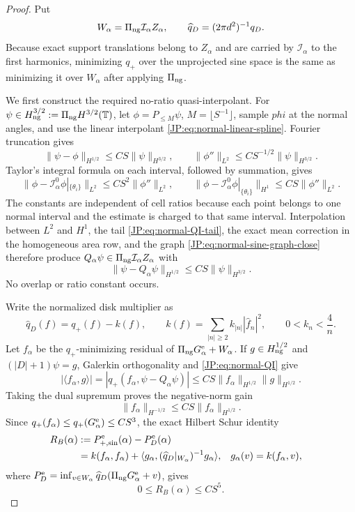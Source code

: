 \documentclass[11pt]{amsart}
\numberwithin{equation}{section}
\theoremstyle{definition}
\theoremstyle{remark}
\begin{document}
\begin{proof}
Put
\[
 W_\alpha=\Pi_{\rm ng}\mathcal I_\alpha Z_\alpha,
 \qquad
 \widehat q_D=(2\pi d^2)^{-1}q_D.
\]
Because exact support translations belong to $Z_\alpha$ and are carried by
$\mathcal I_\alpha$ to the first harmonics, minimizing $q_+$ over the
unprojected sine space is the same as minimizing it over $W_\alpha$ after
applying $\Pi_{\rm ng}$.

We first construct the required no-ratio quasi-interpolant.  For
$\psi\in H_{\rm ng}^{3/2}:=\Pi_{\rm ng}H^{3/2}(\mathbb T)$, let
$\phi=P_{\le M}\psi$, $M=\lfloor S^{-1}\rfloor$, sample $phi$ at the
normal angles, and use the linear interpolant
\eqref{JP:eq:normal-linear-spline}.  Fourier truncation gives
\begin{equation}\label{JP:eq:normal-QI-tail}
 \|\psi-\phi\|_{H^{1/2}}\le CS\|\psi\|_{H^{3/2}},
 \qquad
 \|\phi''\|_{L^2}\le CS^{-1/2}\|\psi\|_{H^{3/2}}.
\end{equation}
Taylor's integral formula on each interval, followed by summation, gives
\[
 \|\phi-\mathcal I_\alpha^0\phi|_{\{\theta_i\}}\|_{L^2}
 \le CS^2\|\phi''\|_{L^2},\qquad
 \|\phi-\mathcal I_\alpha^0\phi|_{\{\theta_i\}}\|_{H^1}
 \le CS\|\phi''\|_{L^2}.
\]
The constants are independent of cell ratios because each point belongs to
one normal interval and the estimate is charged to that same interval.
Interpolation between $L^2$ and $H^1$, the tail
\eqref{JP:eq:normal-QI-tail}, the exact mean correction in the homogeneous
area row, and the graph \eqref{JP:eq:normal-sine-graph-close} therefore
produce
$Q_\alpha\psi\in\Pi_{\rm ng}\mathcal I_\alpha Z_\alpha$ with
\begin{equation}\label{JP:eq:normal-QI}
 \|\psi-Q_\alpha\psi\|_{H^{1/2}}
 \le CS\|\psi\|_{H^{3/2}}.
\end{equation}
No overlap or ratio constant occurs.

Write the normalized disk multiplier as
\[
 \widehat q_D(f)
 =q_+(f)-k(f),\qquad
 k(f)=\sum_{|n|\ge2}k_{|n|}|\widehat f_n|^2,
 \qquad 0<k_n<\frac4n.
\]
Let $f_\alpha$ be the $q_+$-minimizing residual of
$\Pi_{\rm ng}G_\alpha^{\rm e}+W_\alpha$.  If
$g\in H_{\rm ng}^{1/2}$ and $(|D|+1)\psi=g$, Galerkin orthogonality and
\eqref{JP:eq:normal-QI} give
\[
 |\langle f_\alpha,g\rangle|
 =|q_+(f_\alpha,\psi-Q_\alpha\psi)|
 \le CS\|f_\alpha\|_{H^{1/2}}\|g\|_{H^{1/2}}.
\]
Taking the dual supremum proves the negative-norm gain
\[
 \|f_\alpha\|_{H^{-1/2}}
 \le CS\|f_\alpha\|_{H^{1/2}}.
\]
Since $q_+(f_\alpha)\le q_+(G_\alpha^{\rm e})\le CS^3$, the exact
Hilbert Schur identity
\begin{align*}
 R_B(\alpha)&:=P_{+,\sin}^{\rm e}(\alpha)-P_D^{\rm e}(\alpha)\\
 &=k(f_\alpha,f_\alpha)
  +\langle g_\alpha,
     (\widehat q_D|_{W_\alpha})^{-1}g_\alpha\rangle,
 &g_\alpha(v)&=k(f_\alpha,v),
\end{align*}
where
$P_D^{\rm e}=\inf_{v\in W_\alpha}\widehat q_D
(\Pi_{\rm ng}G_\alpha^{\rm e}+v)$, gives
\begin{equation}\label{JP:eq:normal-bessel-absolute}
 0\le R_B(\alpha)\le CS^5.
\end{equation}


\end{proof}
\end{document}
